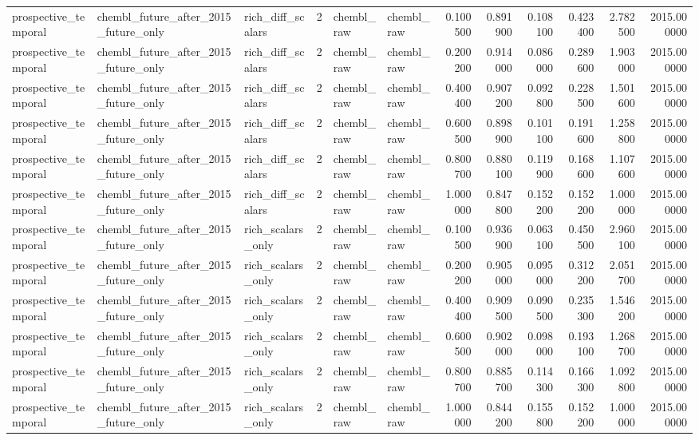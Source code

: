 \begin{longtable}{lllrllrrrrrr}
prospective\_temporal & chembl\_future\_after\_2015\_future\_only & rich\_diff\_scalars & 2 & chembl\_raw & chembl\_raw & 0.100500 & 0.891900 & 0.108100 & 0.423400 & 2.782500 & 2015.000000 \\
prospective\_temporal & chembl\_future\_after\_2015\_future\_only & rich\_diff\_scalars & 2 & chembl\_raw & chembl\_raw & 0.200200 & 0.914000 & 0.086000 & 0.289600 & 1.903000 & 2015.000000 \\
prospective\_temporal & chembl\_future\_after\_2015\_future\_only & rich\_diff\_scalars & 2 & chembl\_raw & chembl\_raw & 0.400400 & 0.907200 & 0.092800 & 0.228500 & 1.501600 & 2015.000000 \\
prospective\_temporal & chembl\_future\_after\_2015\_future\_only & rich\_diff\_scalars & 2 & chembl\_raw & chembl\_raw & 0.600500 & 0.898900 & 0.101100 & 0.191600 & 1.258800 & 2015.000000 \\
prospective\_temporal & chembl\_future\_after\_2015\_future\_only & rich\_diff\_scalars & 2 & chembl\_raw & chembl\_raw & 0.800700 & 0.880100 & 0.119900 & 0.168600 & 1.107600 & 2015.000000 \\
prospective\_temporal & chembl\_future\_after\_2015\_future\_only & rich\_diff\_scalars & 2 & chembl\_raw & chembl\_raw & 1.000000 & 0.847800 & 0.152200 & 0.152200 & 1.000000 & 2015.000000 \\
prospective\_temporal & chembl\_future\_after\_2015\_future\_only & rich\_scalars\_only & 2 & chembl\_raw & chembl\_raw & 0.100500 & 0.936900 & 0.063100 & 0.450500 & 2.960100 & 2015.000000 \\
prospective\_temporal & chembl\_future\_after\_2015\_future\_only & rich\_scalars\_only & 2 & chembl\_raw & chembl\_raw & 0.200200 & 0.905000 & 0.095000 & 0.312200 & 2.051700 & 2015.000000 \\
prospective\_temporal & chembl\_future\_after\_2015\_future\_only & rich\_scalars\_only & 2 & chembl\_raw & chembl\_raw & 0.400400 & 0.909500 & 0.090500 & 0.235300 & 1.546200 & 2015.000000 \\
prospective\_temporal & chembl\_future\_after\_2015\_future\_only & rich\_scalars\_only & 2 & chembl\_raw & chembl\_raw & 0.600500 & 0.902000 & 0.098000 & 0.193100 & 1.268700 & 2015.000000 \\
prospective\_temporal & chembl\_future\_after\_2015\_future\_only & rich\_scalars\_only & 2 & chembl\_raw & chembl\_raw & 0.800700 & 0.885700 & 0.114300 & 0.166300 & 1.092800 & 2015.000000 \\
prospective\_temporal & chembl\_future\_after\_2015\_future\_only & rich\_scalars\_only & 2 & chembl\_raw & chembl\_raw & 1.000000 & 0.844200 & 0.155800 & 0.152200 & 1.000000 & 2015.000000 \\

\end{longtable}
